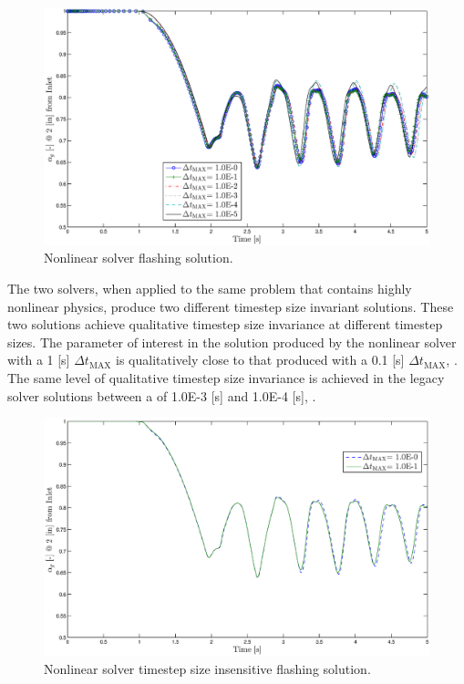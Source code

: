 \begin{figure}[h!t]
\centering
\includegraphics[width=.94\textwidth]{images/nl_flashing_al_2in.eps}
\caption{Nonlinear solver flashing solution.}
\label{fig:nl_mode_flashing}
\end{figure}

The two solvers, when applied to the same problem that contains highly nonlinear physics, produce two different timestep size invariant solutions.
These two solutions achieve qualitative timestep size invariance at different timestep sizes.
The parameter of interest in the solution produced by the nonlinear solver with a 1 [s] $\Delta t_{\text{MAX}}$ is qualitatively close to that produced with a 0.1 [s] $\Delta t_{\text{MAX}}$, .
The same level of qualitative timestep size invariance is achieved in the legacy solver solutions between a \dtmax{} of 1.0E-3 [s] and 1.0E-4 [s], .


\begin{figure}[h!t]
\centering
\includegraphics[width=.94\textwidth]{images/nl_flashing_1em0_1em1.eps}
\caption{Nonlinear solver timestep size insensitive flashing solution.}
\label{fig:nl_flashing_compare}
\end{figure}

